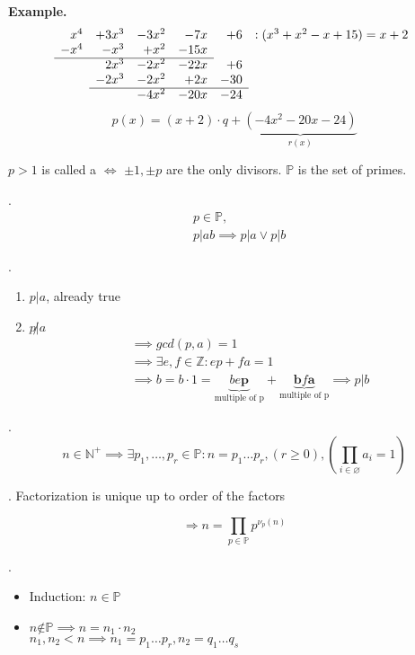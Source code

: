 \textbf{Example.}
\[
  \begin{array}{rrrrrr}
    x^4 & + 3x^3 & - 3x^2 & - 7x  & +6  & : ( x^3 + x^2 - x + 15) = x+2 \\
    -x^4 & - x^3  & + x^2  & - 15x &     &\\
    \cline{1-4}
         &  2x^3  & - 2x^2 & - 22x & + 6 &\\
         & -2x^3  & - 2x^2 & + 2x  & -30 &\\
    \cline{2-5}
         &        & - 4x^2 & - 20x & -24 &\\
  \end{array}
\]
\[
  p(x) = (x+2) \cdot q + \underbrace{(-4x^2-20x-24)}_{r(x)}
\]

\begin{definition}
$p>1$ is called a  $\iff$ $\pm 1, \pm p$ are the only divisors. $\mathbb{P}$ is the set of primes.
\end{definition}

\Theorem.
\begin{align*}
  & p\in \mathbb{P}, \\
  & p|ab \implies p|a \vee p|b
\end{align*}

\Proof.
\begin{enumerate}[{Case} 1)]
  \item $p|a$, already true\\
  \item $p \not| a$
  \begin{align*}
    &\implies gcd(p,a) = 1 \\
    &\implies \exists e,f \in \mathbb{Z}: ep + fa = 1 \\
    &\implies b = b \cdot 1 =
      \underbrace{b e \mathbf{p}}_{\text{multiple of p}} +
      \underbrace{\mathbf{b} f \mathbf{a}}_{\text{multiple of p}} \implies p|b
  \end{align*}
\end{enumerate}
\Theorem.
\[
  n \in \mathbb{N}^{+} \implies \exists p_1, \ldots ,p_r \in \mathbb{P}: n = p_1 \ldots p_r, (r \geq 0), (\prod_{i\in \varnothing} a_i = 1)
\]

\Remark.
Factorization is unique up to order of the factors

\[
  \Rightarrow n = \prod_{p \in \mathbb{P}} p^{\nu_p(n)}
\]

\Proof.
\begin{itemize}

  \item Induction: $n ∈ \mathbb{P}$

  \item $n \not ∈ \mathbb{P} \implies n = n_1 \cdot n_2$\\
  $n_1, n_2 < n \implies n_1 = p_1 \dots p_r, n_2 = q_1  \dots q_s$

\end{itemize}

